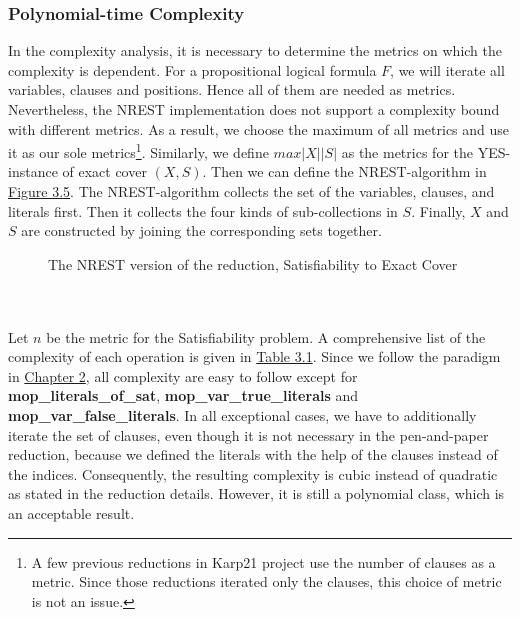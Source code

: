 \subsubsection{Polynomial-time Complexity}
In the complexity analysis, it is necessary to determine the metrics on which the complexity is dependent. For 
a propositional logical formula $F$, we will iterate all variables, clauses and positions. Hence all of them are needed as metrics. 
Nevertheless, the NREST implementation does not support a complexity bound with different metrics. 
As a result, we choose the maximum of all metrics and use it as our sole metrics\footnote{A few previous reductions in Karp21 project use the number of clauses 
as a metric. Since those reductions iterated only the clauses, this choice of metric is not an issue.}. Similarly, we define $max |X| |S|$ as the metrics 
for the YES-instance of exact cover  $(X, S)$. Then we can define the NREST-algorithm in \hyperref[fig:3.5]{Figure 3.5}.
The NREST-algorithm collects the set of the variables, clauses, and literals first. 
Then it collects the four kinds of sub-collections in $S$. 
Finally, $X$ and $S$ are constructed by joining the corresponding sets together.
\begin{figure}[!h]
    \centering
    \caption{The NREST version of the reduction, Satisfiability to Exact Cover}
    \label{fig:3.5}
\end{figure}\\\\
Let $n$ be the metric for the Satisfiability problem.
A comprehensive list of the complexity of each operation is given in \hyperref[table:3.1]{Table 3.1}. 
Since we follow the paradigm in \hyperref[para1]{Chapter 2}, all complexity are easy to follow 
except for \textbf{mop\_literals\_of\_sat}, \textbf{mop\_var\_true\_literals} and \textbf{mop\_var\_false\_literals}. 
In all exceptional cases, we have to additionally iterate the set of clauses, even though it is not necessary in the pen-and-paper reduction, 
because we defined the literals with the help of the clauses instead of the indices. Consequently, the resulting 
complexity is cubic instead of quadratic as stated in the reduction details. However, it is still 
a polynomial class, which is an acceptable result.
